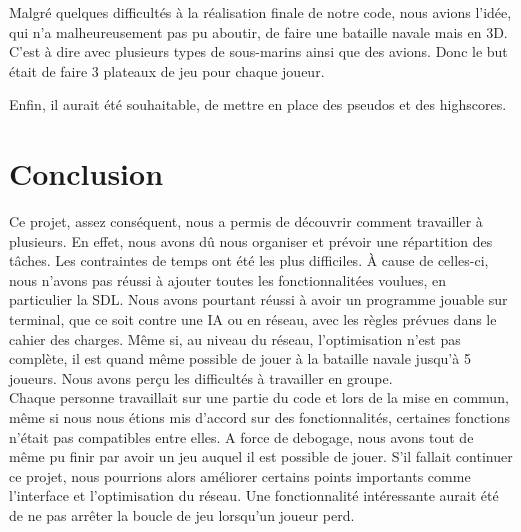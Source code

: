 \documentclass[a4paper,12pt]{article}
\begin{document}
    \vspace{2\baselineskip}
        Malgré quelques difficultés à la réalisation finale de notre code, nous avions l'idée, qui n'a malheureusement pas pu aboutir, de faire une bataille navale mais en 3D. C'est à dire avec plusieurs types de sous-marins ainsi que des avions. Donc le but était de faire 3 plateaux de jeu pour chaque joueur.
     
     
    \vspace{2\baselineskip}
    Enfin, il aurait été souhaitable, de mettre en place des pseudos et des highscores.

   
    
    


\newpage
\section {Conclusion} 
    Ce projet, assez conséquent, nous a permis de découvrir comment travailler à plusieurs. En effet, nous avons dû nous organiser et prévoir une répartition des tâches. 
    Les contraintes de temps ont été les plus difficiles. À cause de celles-ci, nous n'avons pas réussi à ajouter toutes les fonctionnalitées voulues, en particulier la SDL. Nous avons pourtant réussi à avoir un programme jouable sur terminal, que ce soit contre une IA ou en réseau, avec les règles prévues dans le cahier des charges. Même si, au niveau du réseau, l'optimisation n'est pas complète, il est quand même possible de jouer à la bataille navale jusqu'à 5 joueurs. Nous avons perçu les difficultés à travailler en groupe. \\

    Chaque personne travaillait sur une partie du code et lors de la mise en commun, même si nous nous étions mis d'accord sur des fonctionnalités, certaines fonctions n'était pas compatibles entre elles. A force de debogage, nous avons tout de même pu finir par avoir un jeu auquel il est possible de jouer. S'il fallait continuer ce projet, nous pourrions alors améliorer certains points importants comme l'interface et l'optimisation du réseau. Une fonctionnalité intéressante aurait été de ne pas arrêter la boucle de jeu lorsqu'un joueur perd. \\

\newpage
\end{document}
